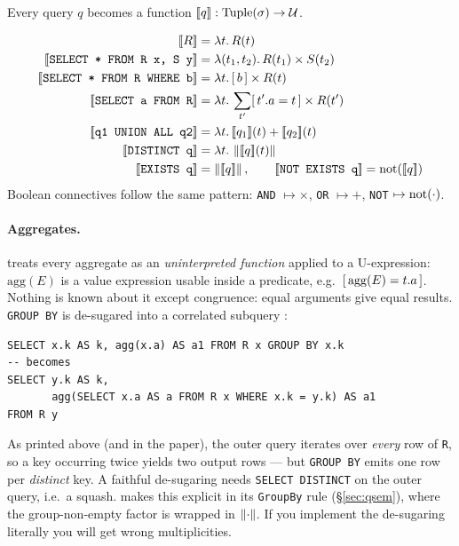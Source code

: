 Every query $q$ becomes a function $[\![ q ]\!] : \mathrm{Tuple}(\sigma)\to\mathcal{U}$.

\begin{align*}
\den{R} &= \lam{t}{R(t)}\\
\den{\text{\texttt{SELECT * FROM R x, S y}}} &= \lam{(t_1,t_2)}{R(t_1)\times S(t_2)}\\
\den{\text{\texttt{SELECT * FROM R WHERE b}}} &= \lam{t}{\ind{b}\times R(t)}\\
\den{\text{\texttt{SELECT a FROM R}}} &= \lam{t}{\usum{t'}\ind{t'.a = t}\times R(t')}\\
\den{\text{\texttt{q1 UNION ALL q2}}} &= \lam{t}{\den{q_1}(t)+\den{q_2}(t)}\\
\den{\text{\texttt{DISTINCT q}}} &= \lam{t}{\sq{\den{q}(t)}}\\
\den{\text{\texttt{EXISTS q}}} &= \sq{\den{q}}, \qquad
\den{\text{\texttt{NOT EXISTS q}}} = \notu{\den{q}}
\end{align*}
Boolean connectives follow the same pattern: \texttt{AND} $\mapsto \times$,
\texttt{OR} $\mapsto +$, \texttt{NOT} $\mapsto \mathrm{not}(\cdot)$.

\paragraph{Aggregates.}
\udp{} treats every aggregate as an \emph{uninterpreted function} applied to a
U-expression: $\mathrm{agg}(E)$ is a value expression usable inside a predicate, e.g.\
$[\,\mathrm{agg}(E)=t.a\,]$. Nothing is known about it except congruence: equal arguments
give equal results. \lstinline|GROUP BY| is de-sugared into a correlated subquery
\cite[\S3.2]{udp}:

\begin{lstlisting}[style=sql]
SELECT x.k AS k, agg(x.a) AS a1 FROM R x GROUP BY x.k
-- becomes
SELECT y.k AS k,
       agg(SELECT x.a AS a FROM R x WHERE x.k = y.k) AS a1
FROM R y
\end{lstlisting}

\begin{remark}[an implementation trap]\label{rem:groupby}
As printed above (and in the paper), the outer query iterates over \emph{every} row of
\texttt{R}, so a key occurring twice yields two output rows --- but \lstinline|GROUP BY|
emits one row per \emph{distinct} key. A faithful de-sugaring needs
\lstinline|SELECT DISTINCT| on the outer query, i.e.\ a squash. \QED{} makes this explicit
in its \texttt{GroupBy} rule (\S\ref{sec:qsem}), where the group-non-empty factor is
wrapped in $\left\lVert \cdot \right\rVert$. If you implement the de-sugaring literally you will get wrong
multiplicities.
\end{remark}

